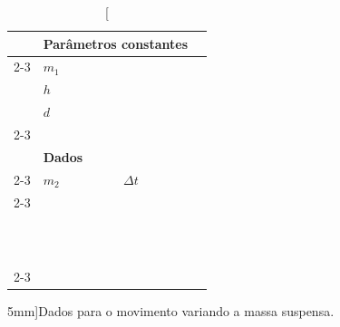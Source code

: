 \begin{table}[!hb]
\centering
\begin{tabular}{lp{25mm}p{25mm}l}
\toprule
	& \multicolumn{2}{l}{\textbf{Parâmetros constantes}} & \\
	\cmidrule{2-3}
	& $m_1$ \cellcolor[gray]{0.89} & \cellcolor[gray]{0.92} \\
	& $h$ \cellcolor[gray]{0.95} & \cellcolor[gray]{0.97} \\
	& $d$ \cellcolor[gray]{0.89} & \cellcolor[gray]{0.92} \\
	\cmidrule{2-3}
\\
	& \multicolumn{2}{l}{\textbf{Dados}} \\
	\cmidrule{2-3}
	& $m_2$ & $\Delta t$ & \\
	\cmidrule{2-3}
	& \cellcolor[gray]{0.89} & \cellcolor[gray]{0.92} \\
	& \cellcolor[gray]{0.95} & \cellcolor[gray]{0.97} \\
	& \cellcolor[gray]{0.89} & \cellcolor[gray]{0.92} \\
	& \cellcolor[gray]{0.95} & \cellcolor[gray]{0.97} \\
	& \cellcolor[gray]{0.89} & \cellcolor[gray]{0.92} \\
	& \cellcolor[gray]{0.95} & \cellcolor[gray]{0.97} \\
	& \cellcolor[gray]{0.89} & \cellcolor[gray]{0.92} \\
	& \cellcolor[gray]{0.95} & \cellcolor[gray]{0.97} \\
	& \cellcolor[gray]{0.89} & \cellcolor[gray]{0.92} \\
	& \cellcolor[gray]{0.95} & \cellcolor[gray]{0.97} \\
	& \cellcolor[gray]{0.89} & \cellcolor[gray]{0.92} \\
	& \cellcolor[gray]{0.95} & \cellcolor[gray]{0.97} \\
	\cmidrule{2-3}
\bottomrule
\end{tabular}
\caption[][5mm]{Dados para o movimento variando a massa suspensa.}
\label{TabelaDadosEnergiaMecanica2}
\end{table}

